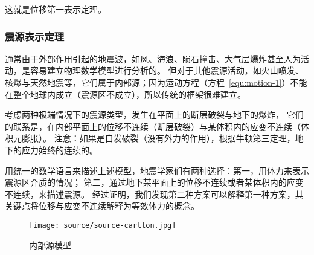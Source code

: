 这就是位移第一表示定理。




\subsubsection{震源表示定理}

通常由于外部作用引起的地震波，如风、海浪、陨石撞击、大气层爆炸甚至人为活动，是容易建立物理数学模型进行分析的。
但对于其他震源活动，如火山喷发、核爆与天然地震等，它们属于内部源；因为运动方程（方程~\ref{equ:motion-1}）不能在整个地球内成立（震源区不成立），所以传统的框架很难建立。

考虑两种极端情况下的震源类型，发生在平面上的断层破裂与地下的爆炸，
它们的联系是，在内部平面上的位移不连续（断层破裂）与某体积内的应变不连续（体积元膨胀）。
注意：如果是自发破裂（没有外力的作用），根据牛顿第三定理，地下的应力始终的连续的。

用统一的数学语言来描述上述模型，地震学家们有两种选择：第一，用体力来表示震源区介质的情况；
第二，通过地下某平面上的位移不连续或者某体积内的应变不连续，来描述震源。
经过证明，我们发现第二种方案可以解释第一种方案，其关键点将位移与应变不连续解释为等效体力的概念\citep{Burridge1964}。

\begin{figure}[h]
    \centering
    \texttt{[image: source/source-cartton.jpg]}
    \caption{内部源模型}
    \label{fig:source-cartton}
\end{figure}

